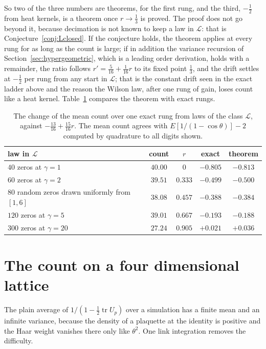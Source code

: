 So two of the three numbers are theorems, for the first rung, and the third, $-\frac12$ from heat kernels, is a theorem once $r\to\frac13$ is proved. The proof does not go beyond it, because decimation is not known to keep a law in $\mathcal L$: that is Conjecture~\ref{conj:Lclosed}. If the conjecture holds, the theorem applies at every rung for as long as the count is large; if in addition the variance recursion of Section~\ref{sec:hypergeometric}, which is a leading order derivation, holds with a remainder, the ratio follows $r'=\frac5{16}+\frac1{16}r$ to its fixed point $\frac13$, and the drift settles at $-\frac12$ per rung from any start in $\mathcal L$; that is the constant drift seen in the exact ladder above and the reason the Wilson law, after one rung of gain, loses count like a heat kernel. Table~\ref{tab:firstrung} compares the theorem with exact rungs.

\begin{table}[t]
\centering\small
\begin{tabular}{lcccc}
\toprule
law in $\mathcal L$ & count & $r$ & exact & theorem \\ \midrule
$40$ zeros at $\gamma=1$ & $40.00$ & $0$ & $-0.805$ & $-0.813$ \\
$60$ zeros at $\gamma=2$ & $39.51$ & $0.333$ & $-0.499$ & $-0.500$ \\
$80$ random zeros drawn uniformly from $[1,6]$ & $38.08$ & $0.457$ & $-0.388$ & $-0.384$ \\
$120$ zeros at $\gamma=5$ & $39.01$ & $0.667$ & $-0.193$ & $-0.188$ \\
$300$ zeros at $\gamma=20$ & $27.24$ & $0.905$ & $+0.021$ & $+0.036$ \\
\bottomrule
\end{tabular}
\caption[The first rung against the theorem]{The change of the mean count over one exact rung from laws of the class $\mathcal L$, against $-\frac{13}{16}+\frac{15}{16}r$. The mean count agrees with $E[1/(1-\cos\theta)]-2$ computed by quadrature to all digits shown.}
\label{tab:firstrung}
\end{table}

\section{The count on a four dimensional lattice}\label{sec:countlattice}

The plain average of $1/(1-\frac12\operatorname{tr}U_p)$ over a simulation has a finite mean and an infinite variance, because the density of a plaquette at the identity is positive and the Haar weight vanishes there only like $\theta^2$. One link integration removes the difficulty.


